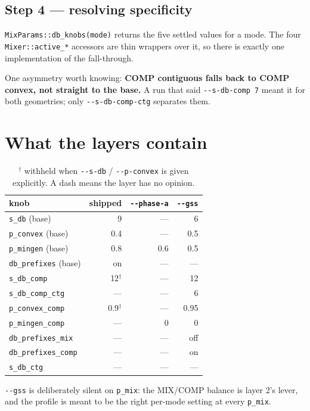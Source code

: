 \documentclass[11pt]{article}
\newcommand{\code}[1]{\texttt{#1}}
\begin{document}
\subsection{Step 4 --- resolving specificity}

\code{MixParams::db\_knobs(mode)} returns the five settled values for a mode.
The four \code{Mixer::active\_*} accessors are thin wrappers over it, so there
is exactly one implementation of the fall-through.

One asymmetry worth knowing: \textbf{COMP contiguous falls back to COMP
convex, not straight to the base.} A run that said \code{-{}-s-db-comp 7} meant
it for both geometries; only \code{-{}-s-db-comp-ctg} separates them.

\section{What the layers contain}

\begin{table}[h]\centering\small
\begin{tabular}{lrrr}
\toprule
knob & shipped & \code{-{}-phase-a} & \code{-{}-gss} \\
\midrule
\code{s\_db} (base) & 9 & --- & 6 \\
\code{p\_convex} (base) & 0.4 & --- & 0.5 \\
\code{p\_mingen} (base) & 0.8 & 0.6 & 0.5 \\
\code{db\_prefixes} (base) & on & --- & --- \\
\code{s\_db\_comp} & 12$^\dagger$ & --- & 12 \\
\code{s\_db\_comp\_ctg} & --- & --- & 6 \\
\code{p\_convex\_comp} & 0.9$^\dagger$ & --- & 0.95 \\
\code{p\_mingen\_comp} & --- & 0 & 0 \\
\code{db\_prefixes\_mix} & --- & --- & off \\
\code{db\_prefixes\_comp} & --- & --- & on \\
\code{s\_db\_ctg} & --- & --- & --- \\
\bottomrule
\end{tabular}
\caption{$^\dagger$ withheld when \code{-{}-s-db} / \code{-{}-p-convex} is
given explicitly. A dash means the layer has no opinion.}
\end{table}

\code{-{}-gss} is deliberately silent on \code{p\_mix}: the MIX/COMP balance is
layer 2's lever, and the profile is meant to be the right per-mode setting at
every \code{p\_mix}.
\end{document}
